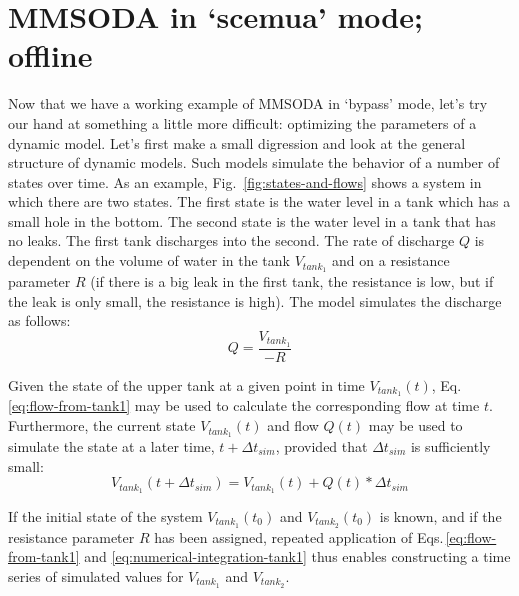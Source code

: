 
\section{MMSODA in `scemua' mode; offline}

Now that we have a working example of MMSODA in `bypass' mode, let's try our hand at something a little more difficult: optimizing the parameters of a dynamic model. Let's first make a small digression and look at the general structure of dynamic models. Such models simulate the behavior of a number of states over time. As an example, Fig.~\ref{fig:states-and-flows} shows a system in which there are two states. The first state is the water level in a tank which has a small hole in the bottom. The second state is the water level in a tank that has no leaks. The first tank discharges into the second. The rate of discharge $Q$ is dependent on the volume of water in the tank $V_{tank_1}$ and on a resistance parameter $R$ (if there is a big leak in the first tank, the resistance is low, but if the leak is only small, the resistance is high). The model simulates the discharge as follows:
\begin{equation}\label{eq:flow-from-tank1}
Q = \frac{V_{tank_1}}{-R}
\end{equation}

Given the state of the upper tank at a given point in time $V_{tank_1}(t)$, Eq.\,\ref{eq:flow-from-tank1} may be used to calculate the corresponding flow at time $t$. Furthermore, the current state $V_{tank_1}(t)$ and flow $Q(t)$ may be used to simulate the state at a later time, $t+\Delta{}t_{sim}$, provided that $\Delta{}t_{sim}$ is sufficiently small:
\begin{equation}\label{eq:numerical-integration-tank1}
V_{tank_1}(t+\Delta{}t_{sim}) = V_{tank_1}(t) + Q(t)*\Delta{}t_{sim}
\end{equation}

If the initial state of the system $V_{tank_1}(t_0)$ and $V_{tank_2}(t_0)$ is known, and if the resistance parameter $R$ has been assigned, repeated application of Eqs.\,\ref{eq:flow-from-tank1} and \ref{eq:numerical-integration-tank1} thus enables constructing a time series of simulated values for $V_{tank_1}$ and $V_{tank_2}$.

